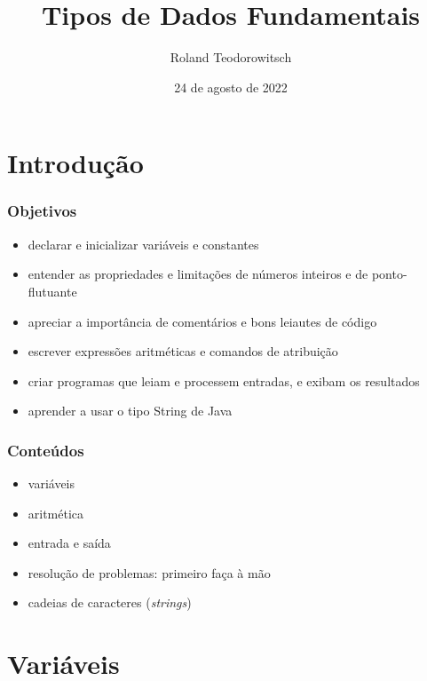 \documentclass[xcolor={dvipsnames,table},aspectratio=169]{beamer}
\title[\sc{Tipos de Dados Fundamentais}]{Tipos de Dados Fundamentais}
\author[Roland Teodorowitsch]{Roland Teodorowitsch}
\institute[FPROG - EP - PUCRS]{Fundamentos de Programação - Escola Politécnica - PUCRS}
\date{24 de agosto de 2022}
\begin{document}
\justifying

\begin{frame}
	\titlepage
\end{frame}

\section{Introdução}

\begin{frame}\frametitle{Objetivos}
\begin{itemize}
	\item declarar e inicializar variáveis e constantes
	\item entender as propriedades e limitações de números inteiros e de ponto-flutuante
	\item apreciar a importância de comentários e bons leiautes de código
	\item escrever expressões aritméticas e comandos de atribuição
	\item criar programas que leiam e processem entradas, e exibam os resultados
	\item aprender a usar o tipo String de Java
\end{itemize}
\end{frame}

\begin{frame}\frametitle{Conteúdos}
\begin{itemize}
	\item variáveis
	\item aritmética
	\item entrada e saída
	\item resolução de problemas: primeiro faça à mão
	\item cadeias de caracteres (\emph{strings})
\end{itemize}
\end{frame}

\section{Variáveis}
\end{document}
